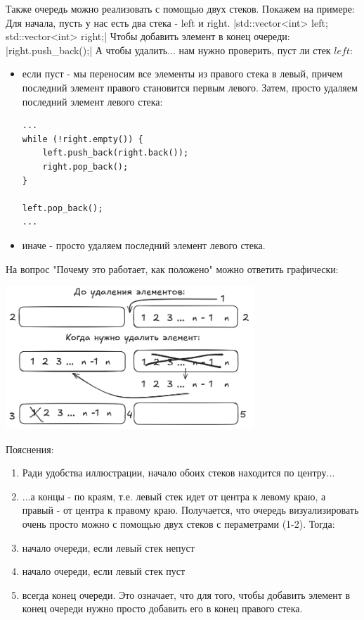 \documentclass[a4paper,12pt]{article}
\begin{document}
\begin{itemize}
	      Также очередь можно реализовать с помощью двух стеков. Покажем на примере:
	      Для начала, пусть у нас есть два стека - left и right.
	      |std::vector<int> left; std::vector<int> right;|
	      Чтобы добавить элемент в конец очереди:
	      |right.push_back();|
	      А чтобы удалить... нам нужно проверить, пуст ли стек $left$:
	      \begin{itemize}
		      \item если пуст - мы переносим все элементы из правого стека в левый, причем последний
		            элемент правого становится первым левого. Затем, просто удаляем последний элемент
		            левого стека:
		            \begin{verbatim}
...
while (!right.empty()) {
    left.push_back(right.back());
    right.pop_back();
}

left.pop_back();
...
\end{verbatim}
		      \item иначе - просто удаляем последний элемент левого стека.
	      \end{itemize}

	      На вопрос "Почему это работает, как положено" можно ответить графически:

	      \begin{center}
		      \includegraphics[width=0.7\textwidth]{assets/queue with 2 stacks.png}
	      \end{center}

	      Пояснения:
	      \begin{enumerate}
		      \item Ради удобства иллюстрации, начало обоих стеков находится по центру...
		      \item ...а концы - по краям, т.е. левый стек идет от центра к левому краю, а правый -
		            от центра к правому краю.
		            Получается, что очередь визуализировать очень просто можно с помощью
		            двух стеков с пераметрами (1-2). Тогда:
		      \item начало очереди, если левый стек непуст
		      \item начало очереди, если левый стек пуст
		      \item всегда конец очереди. Это означает, что для того, чтобы добавить элемент в конец
		            очереди нужно просто добавить его в конец правого стека.
	      \end{enumerate}


\end{itemize}
\end{document}
